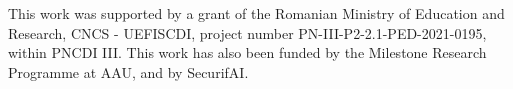 \documentclass[times,twocolumn,final,authoryear]{elsarticle}
\begin{document}
This work was supported by a grant of the Romanian Ministry of Education and Research, CNCS - UEFISCDI, project number PN-III-P2-2.1-PED-2021-0195, within PNCDI III. This work has also been funded by the Milestone Research Programme at AAU, and by SecurifAI.



























































\end{document}
